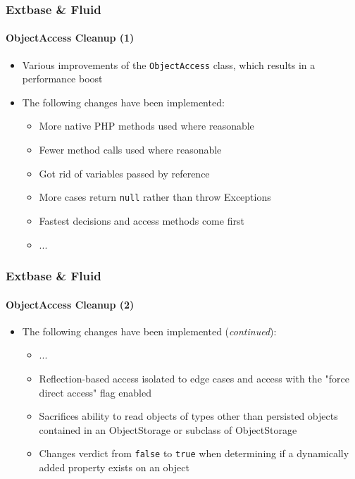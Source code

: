 \begin{frame}[fragile]
	\frametitle{Extbase \& Fluid}
	\framesubtitle{ObjectAccess Cleanup (1)}

	\begin{itemize}

		\item Various improvements of the \texttt{ObjectAccess} class, which results in a performance boost
		\item The following changes have been implemented:

			\begin{itemize}
				\item More native PHP methods used where reasonable
				\item Fewer method calls used where reasonable
				\item Got rid of variables passed by reference
				\item More cases return \texttt{null} rather than throw Exceptions
				\item Fastest decisions and access methods come first
				\item ...
			\end{itemize}

	\end{itemize}

\end{frame}


\begin{frame}[fragile]
	\frametitle{Extbase \& Fluid}
	\framesubtitle{ObjectAccess Cleanup (2)}

	\begin{itemize}

		\item The following changes have been implemented (\textit{continued}):

			\begin{itemize}
				\item ...
				\item Reflection-based access isolated to edge cases and access with the "force direct access" flag enabled
				\item Sacrifices ability to read objects of types other than persisted objects contained in an ObjectStorage or subclass of ObjectStorage
				\item Changes verdict from \texttt{false} to \texttt{true} when determining if a dynamically added property exists on an object
			\end{itemize}

	\end{itemize}

\end{frame}

